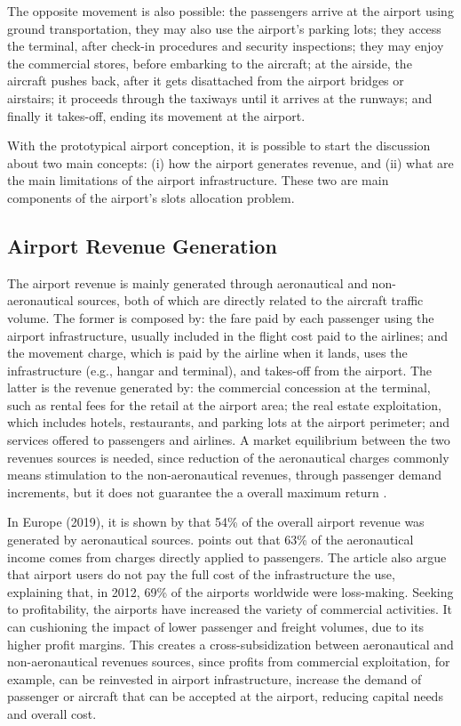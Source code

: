The opposite movement is also possible: the passengers arrive at the airport using ground transportation, they may also use the airport’s parking lots; they access the terminal, after check-in procedures and security inspections; they may enjoy the commercial stores, before embarking to the aircraft; at the airside, the aircraft pushes back, after it gets disattached from the airport bridges or airstairs; it proceeds through the taxiways until it arrives at the runways; and finally it takes-off, ending its movement at the airport. 

With the prototypical airport conception, it is possible to start the discussion about two main concepts: (i) how the airport generates revenue, and (ii) what are the main limitations of the airport infrastructure. These two are main components of the airport’s slots allocation problem.

\subsection{Airport Revenue Generation}

The airport revenue is mainly generated through aeronautical and non-aeronautical sources, both of which are directly related to the aircraft traffic volume. The former is composed by: the fare paid by each passenger using the airport infrastructure, usually included in the flight cost paid to the airlines; and the movement charge, which is paid by the airline when it lands, uses the infrastructure (e.g., hangar and terminal), and takes-off from the airport. The latter is the revenue generated by: the commercial concession at the terminal, such as rental fees for the retail at the airport area; the real estate exploitation, which includes hotels, restaurants, and parking lots at the airport perimeter; and services offered to passengers and airlines. A market equilibrium between the two revenues sources is needed, since reduction of the aeronautical charges commonly means stimulation to the non-aeronautical revenues, through passenger demand increments, but it does not guarantee the a overall maximum return \cite{ICAO2013}.

In Europe (2019), it is shown by  that 54\% of the overall airport revenue was generated by aeronautical sources.  points out that 63\% of the  aeronautical income comes from charges directly applied to passengers. The article also argue that airport users do not pay the full cost of the infrastructure the use, explaining that, in 2012, 69\% of the airports worldwide were loss-making. Seeking to profitability, the airports have increased the variety of commercial activities. It can cushioning the impact of lower passenger and freight volumes, due to its higher profit margins. This creates a cross-subsidization between aeronautical and non-aeronautical revenues sources, since profits from commercial exploitation, for example, can be reinvested in airport infrastructure, increase the demand of passenger or aircraft that can be accepted at the airport, reducing capital needs and overall cost.

